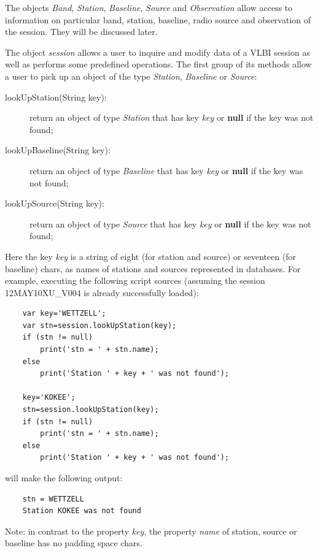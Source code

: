 \documentclass [10pt,letterpaper]{report}
\begin{document}
\noindent
The objects {\sl Band}, {\sl Station}, {\sl Baseline}, {\sl Source} and {\sl Observation}
allow access to information on particular band, station, baseline, radio source and
observation of the session. They will be discussed later.

The object {\sl session} allows a user to inquire and modify data of a VLBI session as
well as performs some predefined operations. The first group of its methods allow a
user to pick up an object of the type {\sl Station}, {\sl Baseline} or {\sl Source}:
\begin{description}
\item[lookUpStation(String key):] return an object of type {\sl Station} that has key {\sl key} or {\bf null} if the key was not found;
\item[lookUpBaseline(String key):] return an object of type {\sl Baseline} that has key {\sl key} or {\bf null} if the key was not found;
\item[lookUpSource(String key):] return an object of type {\sl Source} that has key {\sl key} or  {\bf null} if the key was not found;
\end{description}
\noindent
Here the key {\sl key} is a string of eight (for station and source) or seventeen (for baseline) chars,
as names of stations and sources represented in databases. For example, executing the following script
sources (assuming the session 12MAY10XU\_V004 is already successfully loaded):
{\small\begin{verbatim}
    var key='WETTZELL';
    var stn=session.lookUpStation(key);
    if (stn != null)
        print('stn = ' + stn.name);
    else
        print('Station ' + key + ' was not found');

    key='KOKEE';
    stn=session.lookUpStation(key);
    if (stn != null)
        print('stn = ' + stn.name);
    else
        print('Station ' + key + ' was not found');
\end{verbatim}}
\noindent
will make the following output:
{\small\begin{verbatim}
    stn = WETTZELL
    Station KOKEE was not found
\end{verbatim}}
\noindent
Note: in contrast to the property {\sl key}, the property {\sl name} of station, source or
baseline has no padding space chars.
\end{document}

